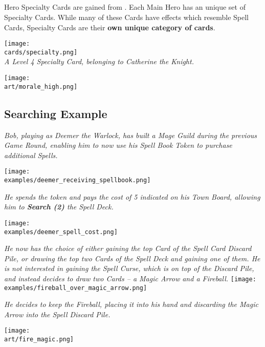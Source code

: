 \begin{multicols*}{2}
\subsection*{}

Hero Specialty Cards are gained from .
Each Main Hero has an unique set of Specialty Cards.
While many of these Cards have effects which resemble Spell Cards, Specialty Cards are their \textbf{own unique category of cards}.

{
  \centering
  \texttt{[image: \\cards/specialty.png]}\\
  \medskip
  \footnotesize\textit{A Level 4 Specialty Card, belonging to Catherine the Knight.}
}

\vfill

\begin{center}
  \texttt{[image: \\art/morale\_high.png]}
\end{center}

\vfill

\subsection*{Searching Example}

\textit{Bob, playing as Deemer the Warlock, has built a Mage Guild during the previous Game Round, enabling him to now use his Spell Book Token to purchase additional Spells.}\par
\texttt{[image: \\examples/deemer\_receiving\_spellbook.png]}\par
\textit{He spends the token and pays the cost of 5  indicated on his Town Board, allowing him to \textbf{Search (2)} the Spell Deck.}\par
\texttt{[image: \\examples/deemer\_spell\_cost.png]}\par
\filbreak
\textit{He now has the choice of either gaining the top Card of the Spell Card Discard Pile, or drawing the top two Cards of the Spell Deck and gaining one of them.
He is not interested in gaining the Spell Curse, which is on top of the Discard Pile, and instead decides to draw two Cards – a Magic Arrow and a Fireball.}
\texttt{[image: \\examples/fireball\_over\_magic\_arrow.png]}\par
\textit{He decides to keep the Fireball, placing it into his hand and discarding the Magic Arrow into the Spell Discard Pile.}

\vspace*{\fill}

\hfill\texttt{[image: \\art/fire\_magic.png]}

\end{multicols*}

